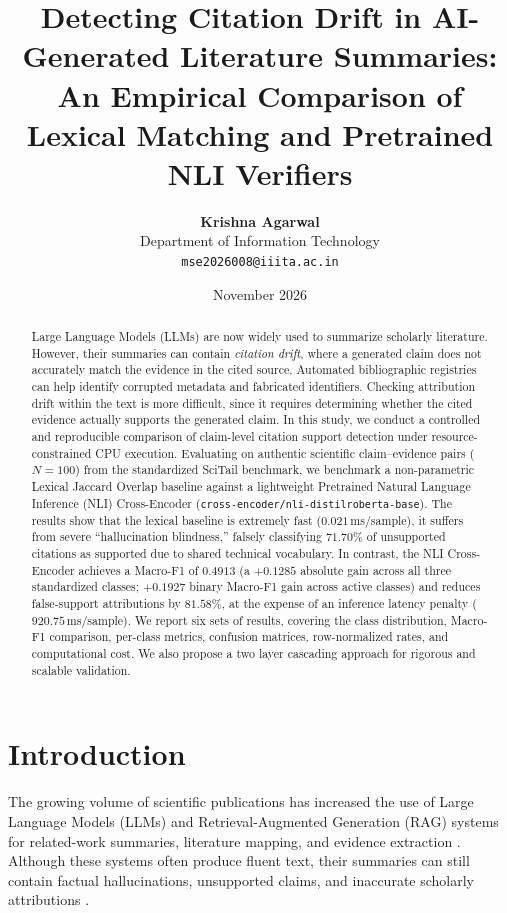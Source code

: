 \documentclass[11pt,a4paper]{article}
\title{\textbf{Detecting Citation Drift in AI-Generated Literature Summaries: \\
An Empirical Comparison of Lexical Matching and Pretrained NLI Verifiers}}
\author{
  \textbf{Krishna Agarwal} \\
  Department of Information Technology \\
  \texttt{mse2026008@iiita.ac.in}
}
\date{November 2026}
\begin{document}
\maketitle

\begin{abstract}
Large Language Models (LLMs) are now widely used to summarize scholarly literature. However, their summaries can contain \textit{citation drift}, where a generated claim does not accurately match the evidence in the cited source. Automated bibliographic registries can help identify corrupted metadata and fabricated identifiers. Checking attribution drift within the text is more difficult, since it requires determining whether the cited evidence actually supports the generated claim. In this study, we conduct a controlled and reproducible comparison of claim-level citation support detection under resource-constrained CPU execution. Evaluating on authentic scientific claim--evidence pairs ($N = 100$) from the standardized SciTail benchmark, we benchmark a non-parametric Lexical Jaccard Overlap baseline against a lightweight Pretrained Natural Language Inference (NLI) Cross-Encoder (\texttt{cross-encoder/}\allowbreak\texttt{nli-distilroberta-base}). The results show that the lexical baseline is extremely fast ($0.021$\,ms/sample), it suffers from severe ``hallucination blindness,'' falsely classifying $71.70\%$ of unsupported citations as supported due to shared technical vocabulary. In contrast, the NLI Cross-Encoder achieves a Macro-F1 of $0.4913$ (a $+0.1285$ absolute gain across all three standardized classes; $+0.1927$ binary Macro-F1 gain across active classes) and reduces false-support attributions by $81.58\%$, at the expense of an inference latency penalty ($920.75$\,ms/sample). We report six sets of results, covering the class distribution, Macro-F1 comparison, per-class metrics, confusion matrices, row-normalized rates, and computational cost. We also propose a two layer cascading approach for rigorous and scalable validation.
\end{abstract}

\section{Introduction}
\label{sec:intro}
The growing volume of scientific publications has increased the use of Large Language Models (LLMs) and Retrieval-Augmented Generation (RAG) systems for related-work summaries, literature mapping, and evidence extraction \cite{wadden2020fact, seetharam2025citation}. Although these systems often produce fluent text, their summaries can still contain factual hallucinations, unsupported claims, and inaccurate scholarly attributions \cite{wieczorek2026detecting}.
\end{document}
